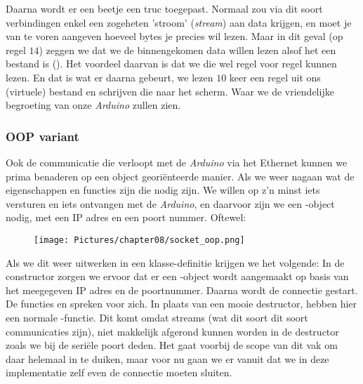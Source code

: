 Daarna wordt er een beetje een truc toegepast. Normaal zou via dit soort verbindingen enkel een zogeheten 'stroom' (\textit{stream}) aan data krijgen, en moet je van te voren aangeven hoeveel bytes je precies wil lezen. Maar in dit geval (op regel $14$) zeggen we dat we de binnengekomen data willen lezen alsof het een bestand is (). Het voordeel daarvan is dat we die wel regel voor regel kunnen lezen. 
En dat is wat er daarna gebeurt, we lezen $10$ keer een regel uit ons (virtuele) bestand  en schrijven die naar het scherm. Waar we de vriendelijke begroeting van onze \textit{Arduino} zullen zien. 

\subsubsection{OOP variant}
Ook de communicatie die verloopt met de \textit{Arduino} via het Ethernet kunnen we prima benaderen op een object georiënteerde manier. Als we weer nagaan wat de eigenschappen en functies zijn die nodig zijn. We willen op z'n minst iets versturen en iets ontvangen met de \textit{Arduino}, en daarvoor zijn we een -object nodig, met een IP adres en een poort nummer. Oftewel:

\begin{figure}[h!]
\centering\texttt{[image: Pictures/chapter08/socket\_oop.png]}
\label{fig:socket_oop} %
\end{figure}

Als we dit weer uitwerken in een klasse-definitie krijgen we het volgende:
In de constructor zorgen we ervoor dat er een -object wordt aangemaakt op basis van het meegegeven IP adres en de poortnummer. Daarna wordt de connectie gestart. De functies  en  spreken voor zich. \newline
In plaats van een mooie destructor, hebben hier een normale -functie. Dit komt omdat streams (wat dit soort dit soort communicaties zijn), niet makkelijk afgerond kunnen worden in de destructor zoals we bij de seriële poort deden. Het gaat voorbij de scope van dit vak om daar helemaal in te duiken, maar voor nu gaan we er vanuit dat we in deze implementatie zelf even de connectie moeten sluiten. \newline

